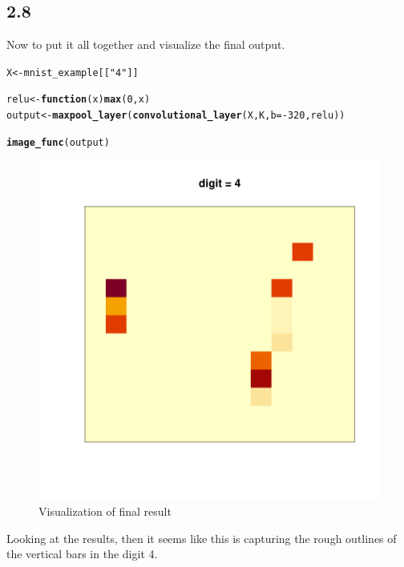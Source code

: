 \documentclass[10pt, a4paper, english]{article}\usepackage[]{graphicx}\usepackage[dvipsnames]{xcolor}
\makeatletter
\def\maxwidth{ %
  \ifdim\Gin@nat@width>\linewidth
    \linewidth
  \else
    \Gin@nat@width
  \fi
}
\newcommand{\hlnum}[1]{\textcolor[rgb]{0.686,0.059,0.569}{#1}}%
\newcommand{\hlstr}[1]{\textcolor[rgb]{0.192,0.494,0.8}{#1}}%
\newcommand{\hlopt}[1]{\textcolor[rgb]{0,0,0}{#1}}%
\newcommand{\hlstd}[1]{\textcolor[rgb]{0.345,0.345,0.345}{#1}}%
\newcommand{\hlkwa}[1]{\textcolor[rgb]{0.161,0.373,0.58}{\textbf{#1}}}%
\newcommand{\hlkwb}[1]{\textcolor[rgb]{0.69,0.353,0.396}{#1}}%
\newcommand{\hlkwc}[1]{\textcolor[rgb]{0.333,0.667,0.333}{#1}}%
\newcommand{\hlkwd}[1]{\textcolor[rgb]{0.737,0.353,0.396}{\textbf{#1}}}%
\newenvironment{kframe}{%
 \def\at@end@of@kframe{}%
 \ifinner\ifhmode%
  \def\at@end@of@kframe{\end{minipage}}%
  \begin{minipage}{\columnwidth}%
 \fi\fi%
 \def\FrameCommand##1{\hskip\@totalleftmargin \hskip-\fboxsep
 \colorbox{shadecolor}{##1}\hskip-\fboxsep
     \hskip-\linewidth \hskip-\@totalleftmargin \hskip\columnwidth}%
 \MakeFramed {\advance\hsize-\width
   \@totalleftmargin\z@ \linewidth\hsize
   \@setminipage}}%
 {\par\unskip\endMakeFramed%
 \at@end@of@kframe}
\newenvironment{knitrout}{}{} %
\makeatother
\begin{document}
 \subsection{2.8}
 Now to put it all together and visualize the final output. 


\begin{knitrout}
\color{fgcolor}\begin{kframe}
\begin{alltt}
\hlstd{X} \hlkwb{<-} \hlstd{mnist_example[[}\hlstr{"4"}\hlstd{]]}

\hlstd{relu} \hlkwb{<-} \hlkwa{function}\hlstd{(}\hlkwc{x}\hlstd{)} \hlkwd{max}\hlstd{(}\hlnum{0}\hlstd{, x)}
\hlstd{output} \hlkwb{<-} \hlkwd{maxpool_layer}\hlstd{(}\hlkwd{convolutional_layer}\hlstd{(X, K,} \hlkwc{b}\hlstd{=}\hlopt{-}\hlnum{320}\hlstd{, relu))}
\end{alltt}
\end{kframe}
\end{knitrout}

\begin{knitrout}
\color{fgcolor}\begin{kframe}
\begin{alltt}
\hlkwd{image_func}\hlstd{(output)}
\end{alltt}
\end{kframe}\begin{figure}
\includegraphics[width=\maxwidth]{figure/unnamed-chunk-43-1} \caption[Visualization of final result]{Visualization of final result}\label{fig:unnamed-chunk-43}
\end{figure}

\end{knitrout}

Looking at the results, then it seems like this is capturing the rough outlines of the vertical bars in the digit 4. 
\end{document}
